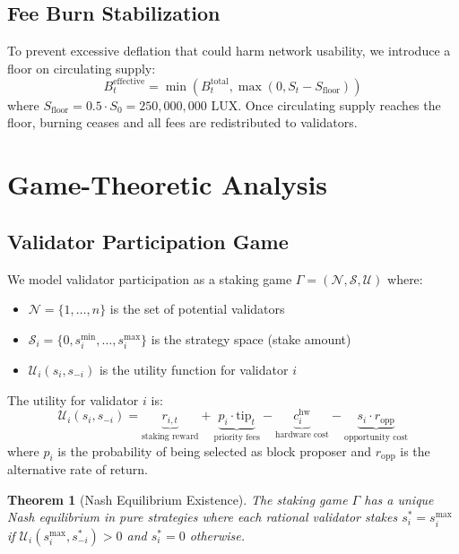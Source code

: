 \documentclass[11pt,a4paper]{article}
\newtheorem{theorem}{Theorem}
\begin{document}
\subsection{Fee Burn Stabilization}

To prevent excessive deflation that could harm network usability, we introduce a floor on circulating supply:
\begin{equation}
    B_t^{\text{effective}} = \min\left(B_t^{\text{total}}, \max\left(0, S_t - S_{\text{floor}}\right)\right)
\end{equation}
where $S_{\text{floor}} = 0.5 \cdot S_0 = 250{,}000{,}000$ LUX. Once circulating supply reaches the floor, burning ceases and all fees are redistributed to validators.

\section{Game-Theoretic Analysis}\label{sec:game}

\subsection{Validator Participation Game}

We model validator participation as a staking game $\Gamma = (\mathcal{N}, \mathcal{S}, \mathcal{U})$ where:
\begin{itemize}
    \item $\mathcal{N} = \{1, \ldots, n\}$ is the set of potential validators
    \item $\mathcal{S}_i = \{0, s_i^{\min}, \ldots, s_i^{\max}\}$ is the strategy space (stake amount)
    \item $\mathcal{U}_i(s_i, s_{-i})$ is the utility function for validator $i$
\end{itemize}

The utility for validator $i$ is:
\begin{equation}
    \mathcal{U}_i(s_i, s_{-i}) = \underbrace{r_{i,t}}_{\text{staking reward}} + \underbrace{p_i \cdot \text{tip}_t}_{\text{priority fees}} - \underbrace{c_i^{\text{hw}}}_{\text{hardware cost}} - \underbrace{s_i \cdot r_{\text{opp}}}_{\text{opportunity cost}}
\end{equation}
where $p_i$ is the probability of being selected as block proposer and $r_{\text{opp}}$ is the alternative rate of return.

\begin{theorem}[Nash Equilibrium Existence]
The staking game $\Gamma$ has a unique Nash equilibrium in pure strategies where each rational validator stakes $s_i^* = s_i^{\max}$ if $\mathcal{U}_i(s_i^{\max}, s_{-i}^*) > 0$ and $s_i^* = 0$ otherwise.
\end{theorem}
\end{document}
